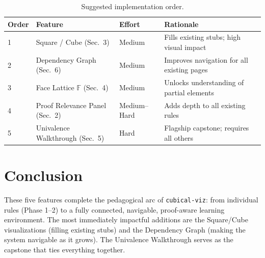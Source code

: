 \documentclass[11pt,a4paper]{article}
\begin{document}
\begin{table}[h]
\centering
\begin{tabular}{lllp{5cm}}
\toprule
\textbf{Order} & \textbf{Feature} & \textbf{Effort} & \textbf{Rationale} \\
\midrule
1 & Square / Cube (Sec.~3) & Medium & Fills existing stubs; high visual impact \\
2 & Dependency Graph (Sec.~6) & Medium & Improves navigation for all existing pages \\
3 & Face Lattice $\mathbb{F}$ (Sec.~4) & Medium & Unlocks understanding of partial elements \\
4 & Proof Relevance Panel (Sec.~2) & Medium–Hard & Adds depth to all existing rules \\
5 & Univalence Walkthrough (Sec.~5) & Hard & Flagship capstone; requires all others \\
\bottomrule
\end{tabular}
\caption{Suggested implementation order.}
\label{tab:priority}
\end{table}

\section{Conclusion}

These five features complete the pedagogical arc of \texttt{cubical-viz}: from
individual rules (Phase 1--2) to a fully connected, navigable, proof-aware
learning environment. The most immediately impactful additions are the
Square/Cube visualizations (filling existing stubs) and the Dependency Graph
(making the system navigable as it grows). The Univalence Walkthrough serves
as the capstone that ties everything together.
\end{document}
